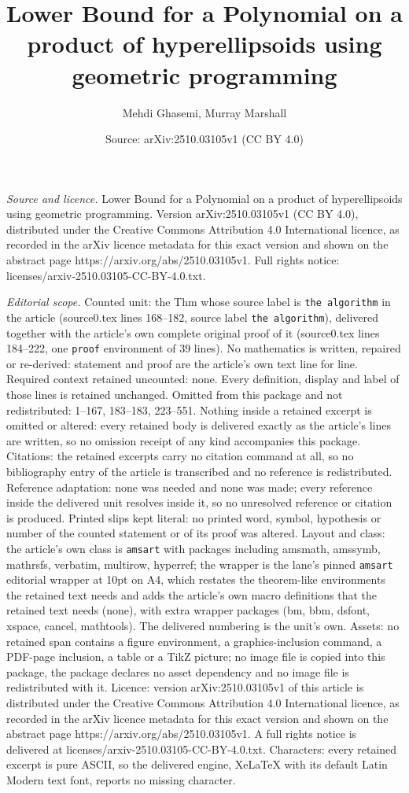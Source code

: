 \documentclass[10pt,a4paper]{amsart}
\title[Lower Bound for a Polynomial on a product of hyperellipsoids]{Lower Bound for a Polynomial on a product of hyperellipsoids using geometric programming}
\author{Mehdi Ghasemi, Murray Marshall}
\date{Source: arXiv:2510.03105v1 (CC BY 4.0)}
\begin{document}
\maketitle

\noindent\emph{Source and licence.} Lower Bound for a Polynomial on a product of hyperellipsoids using geometric programming. Version arXiv:2510.03105v1 (CC BY 4.0), distributed under the Creative Commons Attribution 4.0 International licence, as recorded in the arXiv licence metadata for this exact version and shown on the abstract page https://arxiv.org/abs/2510.03105v1. Full rights notice: licenses/arxiv-2510.03105-CC-BY-4.0.txt.\par\smallskip

\noindent\textit{Editorial scope.} Counted unit: the Thm whose source label is \texttt{the algorithm} in the article (source0.tex lines 168--182, source label \texttt{the algorithm}), delivered together with the article's own complete original proof of it (source0.tex lines 184--222, one \texttt{proof} environment of 39 lines). No mathematics is written, repaired or re-derived: statement and proof are the article's own text line for line. Required context retained uncounted: none. Every definition, display and label of those lines is retained unchanged. Omitted from this package and not redistributed: 1--167, 183--183, 223--551. Nothing inside a retained excerpt is omitted or altered: every retained body is delivered exactly as the article's lines are written, so no omission receipt of any kind accompanies this package. Citations: the retained excerpts carry no citation command at all, so no bibliography entry of the article is transcribed and no reference is redistributed. Reference adaptation: none was needed and none was made; every reference inside the delivered unit resolves inside it, so no unresolved reference or citation is produced. Printed slips kept literal: no printed word, symbol, hypothesis or number of the counted statement or of its proof was altered. Layout and class: the article's own class is \texttt{amsart} with packages including amsmath, amssymb, mathrsfs, verbatim, multirow, hyperref; the wrapper is the lane's pinned \texttt{amsart} editorial wrapper at 10pt on A4, which restates the theorem-like environments the retained text needs and adds the article's own macro definitions that the retained text needs (none), with extra wrapper packages (bm, bbm, dsfont, xspace, cancel, mathtools). The delivered numbering is the unit's own. Assets: no retained span contains a figure environment, a graphics-inclusion command, a PDF-page inclusion, a table or a TikZ picture; no image file is copied into this package, the package declares no asset dependency and no image file is redistributed with it. Licence: version arXiv:2510.03105v1 of this article is distributed under the Creative Commons Attribution 4.0 International licence, as recorded in the arXiv licence metadata for this exact version and shown on the abstract page https://arxiv.org/abs/2510.03105v1. A full rights notice is delivered at licenses/arxiv-2510.03105-CC-BY-4.0.txt. Characters: every retained excerpt is pure ASCII, so the delivered engine, XeLaTeX with its default Latin Modern text font, reports no missing character.
\end{document}
